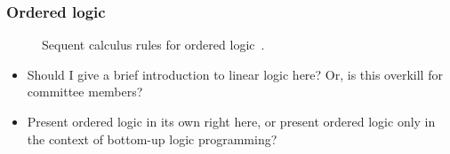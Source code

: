 \subsubsection{Ordered logic}\label{sec:ordered-logic}

\begin{figure}
  \caption{Sequent calculus rules for ordered logic~\autocite{Polakow+Pfenning:MFPS99,Simmons:CMU12}.}
\end{figure}




\begin{itemize}
\item Should I give a brief introduction to linear logic here?  Or, is this overkill for committee members?
\item Present ordered logic in its own right here, or present ordered logic only in the context of bottom-up logic programming?
\end{itemize}

